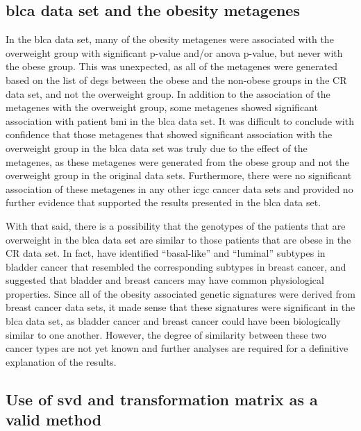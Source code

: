 \subsection{\Gls{blca} data set and the obesity metagenes}
\label{sub:blca_and_obesity_metagenes}

In the \gls{blca} data set, many of the obesity metagenes were associated with the overweight group with significant p-value and/or \gls{anova} p-value, but never with the obese group.
This was unexpected, as all of the metagenes were generated based on the list of \glspl{deg} between the obese and the non-obese groups in the CR data set, and not the overweight group.
In addition to the association of the metagenes with the overweight group, some metagenes showed significant association with patient \gls{bmi} in the \gls{blca} data set.
It was difficult to conclude with confidence that those metagenes that showed significant association with the overweight group in the \gls{blca} data set was truly due to the effect of the metagenes, as these metagenes were generated from the obese group and not the overweight group in the original data sets.
Furthermore, there were no significant association of these metagenes in any other \gls{icgc} cancer data sets and provided no further evidence that supported the results presented in the \gls{blca} data set.

With that said, there is a possibility that the genotypes of the patients that are overweight in the \gls{blca} data set are similar to those patients that are obese in the CR data set.
In fact, \citet{Damrauer2014} have identified ``basal-like'' and ``luminal''  subtypes in bladder cancer that resembled the corresponding subtypes in breast cancer, and suggested that bladder  and breast cancers may have common physiological properties.
Since all of the obesity associated genetic signatures were derived from breast cancer data sets, it made sense that these signatures were significant in the \gls{blca} data set, as bladder cancer and breast cancer could have been biologically similar to one another.
However, the degree of similarity between these two cancer types are not yet known and further analyses are required for a definitive explanation of the results.

\subsection{Use of \gls{svd} and transformation matrix as a valid method}
\label{sub:use_of_svd_and_transformation_matrix_as_a_valid_method}

